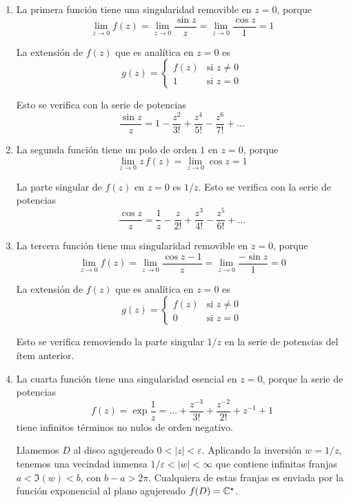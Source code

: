 \begin{solution}
\leavevmode
\begin{enumerate}[label=(\alph*)]
    \item La primera función tiene una singularidad removible en $z = 0$, porque
    $$\lim_{z \to 0} f(z) = \lim_{z \to 0} \frac {\sin z} z = \lim_{z \to 0} \frac {\cos z} 1 = 1$$
    
    La extensión de $f(z)$ que es analítica en $z = 0$ es
    $$
    g(z) =
        \begin{cases}
            f(z) & \text{si } z \ne 0 \\
            1    & \text{si } z = 0
        \end{cases}
    $$
    
    Esto se verifica con la serie de potencias
    $$\frac {\sin z} z = 1 - \frac {z^2} {3!} + \frac {z^4} {5!} - \frac {z^6} {7!} + \dots$$
    
    \item La segunda función tiene un polo de orden $1$ en $z = 0$, porque
    $$\lim_{z \to 0} z \, f(z) = \lim_{z \to 0} \cos z = 1$$
    
    La parte singular de $f(z)$ en $z = 0$ es $1/z$. Esto se verifica con la serie de potencias
    $$\frac {\cos z} z = \frac 1z - \frac z {2!} + \frac {z^3} {4!} - \frac {z^5} {6!} + \dots$$
    
    \item La tercera función tiene una singularidad removible en $z = 0$, porque
    $$\lim_{z \to 0} f(z) = \lim_{z \to 0} \frac {\cos z - 1} z = \lim_{z \to 0} \frac {-\sin z} 1 = 0$$
    
    La extensión de $f(z)$ que es analítica en $z = 0$ es
    $$
    g(z) =
        \begin{cases}
            f(z) & \text{si } z \ne 0 \\
            0    & \text{si } z = 0
        \end{cases}
    $$
    
    Esto se verifica removiendo la parte singular $1/z$ en la serie de potencias del ítem anterior.
    
    \item La cuarta función tiene una singularidad esencial en $z = 0$, porque la serie de potencias
    $$f(z) = \exp \frac 1z = \dots + \frac {z^{-3}} {3!} + \frac {z^{-2}} {2!} + z^{-1} + 1$$
    tiene infinitos términos no nulos de orden negativo.
    
    Llamemos $D$ al disco agujereado $0 < |z| < \varepsilon$. Aplicando la inversión $w = 1/z$, tenemos una vecindad inmensa $1/\varepsilon < |w| < \infty$ que contiene infinitas franjas $a < \Im(w) < b$, con $b - a > 2\pi$. Cualquiera de estas franjas es enviada por la función exponencial al plano agujereado $f(D) = \mathbb C^\star$.
    

\end{enumerate}
\end{solution}

